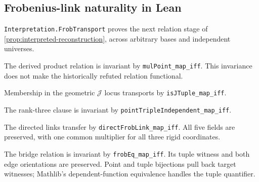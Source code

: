 \documentclass[11pt,oneside]{article}
\theoremstyle{definition}
\theoremstyle{remark}
\newcommand{\Jrel}{\mathcal{J}}
\newcommand{\lean}[1]{\nolinkurl{#1}}
\begin{document}
\subsection{Frobenius-link naturality in Lean}

\lean{Interpretation.FrobTransport} proves the next relation stage of
\cref{prop:interpreted-reconstruction}, across arbitrary bases and independent universes.

The derived product relation is invariant by \lean{mulPoint_map_iff}.
This invariance does not make the historically refuted relation functional.

Membership in the geometric $\Jrel$ locus transports by \lean{isJTuple_map_iff}.

The rank-three clause is invariant by \lean{pointTripleIndependent_map_iff}.

The directed links transfer by \lean{directFrobLink_map_iff}. All five fields are
preserved, with one common multiplier for all three rigid coordinates.

The bridge relation is invariant by \lean{frobEq_map_iff}. Its tuple witness and
both edge orientations are preserved. Point and tuple bijections pull back target witnesses;
Mathlib's dependent-function equivalence handles the tuple quantifier.
\end{document}
